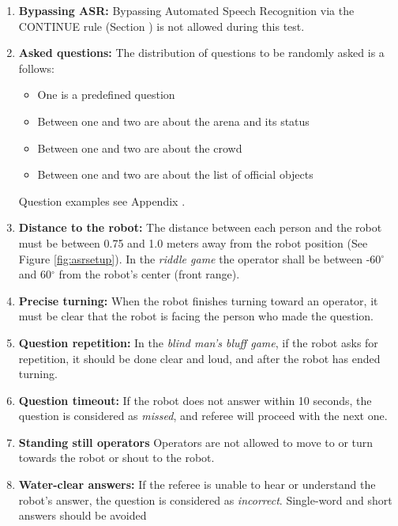 \begin{enumerate}
    \item \textbf{Bypassing ASR:} Bypassing Automated Speech Recognition via the CONTINUE rule (Section ) is not allowed during this test.
    \item \textbf{Asked questions:} The distribution of questions to be randomly asked is a follows:
    \begin{itemize}
        \item One is a predefined question
        \item Between one and two are about the arena and its status
        \item Between one and two are about the crowd
        \item Between one and two are about the list of official objects
    \end{itemize}
    Question examples see Appendix .
    \item \textbf{Distance to the robot:} The distance between each person and the robot must be between 0.75 and 1.0 meters away from the robot position (See Figure \ref{fig:asrsetup}). In the \textit{riddle game} the operator shall be between -60$^{\circ}$ and 60$^{\circ}$ from the robot's center (front range).
    \item \textbf{Precise turning:} When the robot finishes turning toward an operator, it must be clear that the robot is facing the person who made the question.
    \item \textbf{Question repetition:} In the \textit{blind man's bluff game}, if the robot asks for repetition, it should be done clear and loud, and after the robot has ended turning.
    \item \textbf{Question timeout:} If the robot does not answer within 10 seconds, the question is considered as \textit{missed}, and referee will proceed with the next one.
    \item \textbf{Standing still operators} Operators are not allowed to move to or turn towards the robot or shout to the robot.
    \item \textbf{Water-clear answers:} If the referee is unable to hear or understand the robot's answer, the question is considered as \textit{incorrect}. Single-word and short answers should be avoided
\end{enumerate}

